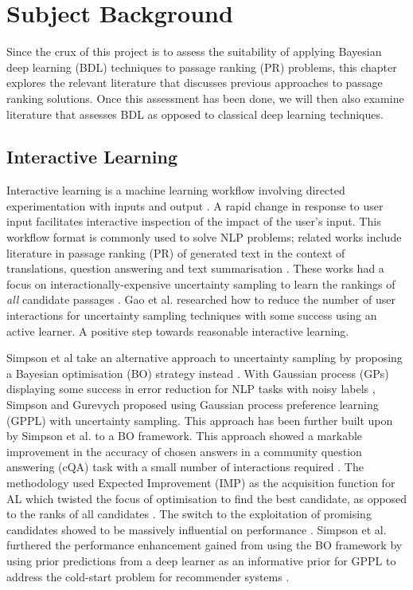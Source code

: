 \documentclass[ %
                    author={James Stephenson},
                supervisor={Dr. Edwin Simpson},
                    degree={MSc},
                     title={Project Plan: Bayesian Deep Learning For Extractive Test Summarisation},
                  subtitle={},
                      type={},
                      year={2022}]{../additions/dissertation}
\begin{document}
	
	\chapter{Subject Background}
	\label{chap:literaturereview}
		
	Since the crux of this project is to assess the suitability of applying Bayesian deep learning (BDL) techniques to passage ranking (PR) problems, this chapter explores the relevant literature that discusses previous approaches to passage ranking solutions. Once this assessment has been done, we will then also examine literature that assesses BDL as opposed to classical deep learning techniques.
		
		\section{Interactive Learning}
		\label{chap:literaturereview:interactive}
		
		Interactive learning is a machine learning workflow involving directed experimentation with inputs and output \cite{Amershi14}. A rapid change in response to user input facilitates interactive inspection of the impact of the user’s input.  This workflow format is commonly used to solve NLP problems; related works include literature in passage ranking (PR) of generated text in the context of translations, question answering and text summarisation \cite{Peris18, Lin17, PVS17}. These works had a focus on interactionally-expensive uncertainty sampling to learn the rankings of \emph{all} candidate passages \cite{Simpson19}. Gao et al. \cite{Gao18} researched how to reduce the number of user interactions for uncertainty sampling techniques with some success using an active learner. A positive step towards reasonable interactive learning.

\medbreak
Simpson et al \cite{Simpson19} take an alternative approach to uncertainty sampling by proposing a Bayesian optimisation (BO) strategy instead \cite{Simpson19}. With Gaussian process (GPs) displaying some success in error reduction for NLP tasks with noisy labels \cite{Cohn13, Beck14}, Simpson and Gurevych \cite{Simpson18} proposed using Gaussian process preference learning (GPPL) with uncertainty sampling. This approach has been further built upon by Simpson et al. \cite{Simpson19} to a BO framework. This approach showed a markable improvement in the accuracy of chosen answers in a community question answering (cQA) task with a small number of interactions required \cite{Simpson19}. The methodology used Expected Improvement (IMP) as the acquisition function for AL which twisted the focus of optimisation to find the best candidate, as opposed to the ranks of all candidates \cite{Simpson19}. The switch to the exploitation of promising candidates showed to be massively influential on performance \cite{Simpson19}. Simpson et al. \cite{Simpson19} furthered the performance enhancement gained from using the BO framework by using prior predictions from a deep learner as an informative prior for GPPL \cite{Simpson19} to address the cold-start problem for recommender systems \cite{Bobadilla12}.
\end{document}
